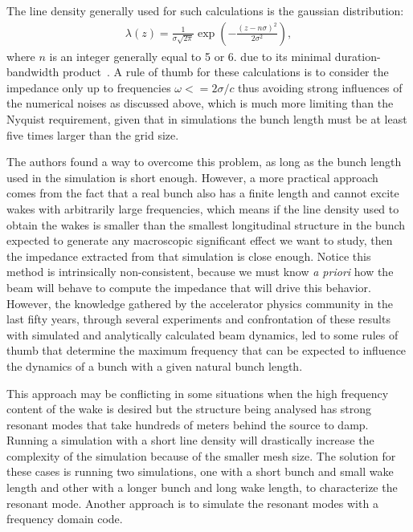     The line density generally used for such calculations is the gaussian distribution:
    \begin{align}
        \lambda(z) = \frac{1}{\sigma\sqrt{2\pi}}
        \exp\left(-\frac{(z-n\sigma)^2}{2\sigma^2}\right),
    \end{align}
    where $n$ is an integer generally equal to 5 or 6.
    due to its minimal duration-bandwidth product~\cite{Niedermayer2016}. A rule of thumb for these calculations is to consider the impedance only up to frequencies $\omega<=2\sigma/c$ thus avoiding strong influences of the numerical noises as discussed above, which is much more limiting than the Nyquist requirement, given that in simulations the bunch length must be at least five times larger than the grid size.

    The authors  found a way to overcome this problem, as long as the bunch length used in the simulation is short enough. However, a more practical approach comes from the fact that a real bunch also has a finite length and cannot excite wakes with arbitrarily large frequencies, which means if the line density used to obtain the wakes is smaller than the smallest longitudinal structure in the bunch expected to generate any macroscopic significant effect we want to study, then the impedance extracted from that simulation is close enough. Notice this method is intrinsically non-consistent, because we must know \emph{a priori} how the beam will behave to compute the impedance that will drive this behavior. However, the knowledge gathered by the accelerator physics community in the last fifty years, through several experiments and confrontation of these results with simulated and analytically calculated beam dynamics, led to some rules of thumb that determine the maximum frequency that can be expected to influence the dynamics of a bunch with a given natural bunch length.

    This approach may be conflicting in some situations when the high frequency content of the wake is desired but the structure being analysed has strong resonant modes that take hundreds of meters behind the source to damp. Running a simulation with a short line density will drastically increase the complexity of the simulation because of the smaller mesh size. The solution for these cases is running two simulations, one with a short bunch and small wake length and other with a longer bunch and long wake length, to characterize the resonant mode. Another approach is to simulate the resonant modes with a frequency domain code.

